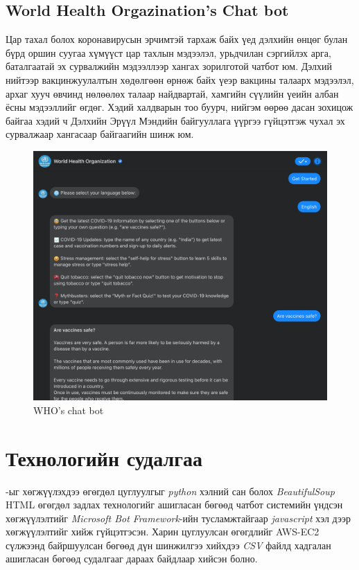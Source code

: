 \subsection{World Health Orgazination's Chat bot}
Цар тахал болох коронавирусын эрчимтэй тархаж байх үед дэлхийн өнцөг булан бүрд оршин суугаа хүмүүст цар тахлын мэдээлэл, урьдчилан сэргийлэх арга, баталгаатай эх сурвалжийн мэдээллээр хангах зорилготой чатбот юм.
Дэлхий нийтээр вакцинжуулалтын хөдөлгөөн өрнөж байх үеэр вакцины талаарх мэдээлэл, архаг хууч өвчинд нөлөөлөх талаар найдвартай, хамгийн сүүлийн үеийн албан ёсны мэдээллийг өгдөг. Хэдий халдварын тоо буурч, нийгэм өөрөө дасан зохицож байгаа хэдий ч Дэлхийн Эрүүл Мэндийн байгууллага үүргээ гүйцэтгэж чухал эх сурвалжаар хангасаар байгаагийн шинж юм. 
\begin{figure}[ht]
  \centering
  \includegraphics[width=\textwidth-4cm]{images/whoBOT.png}
  \caption{WHO's chat bot}\label{fig:chatbotWHO}
\end{figure}
\section{Технологийн судалгаа}
\@title-ыг хөгжүүлэхдээ өгөгдөл цуглуулгыг \textit{python} хэлний сан болох \textit{BeautifulSoup} HTML өгөгдөл задлах технологийг ашигласан бөгөөд чатбот системийн үндсэн хөгжүүлэлтийг \textit{Microsoft Bot Framework}-ийн тусламжтайгаар \textit{javascript} хэл дээр хөгжүүлэлтийг хийж гүйцэтгэсэн. Харин цуглуулсан өгөгдлийг AWS-EC2 сүлжээнд байршуулсан бөгөөд дүн шинжилгээ хийхдээ \textit{CSV} файлд хадгалан ашигласан бөгөөд судалгааг дараах байдлаар хийсэн болно. 

